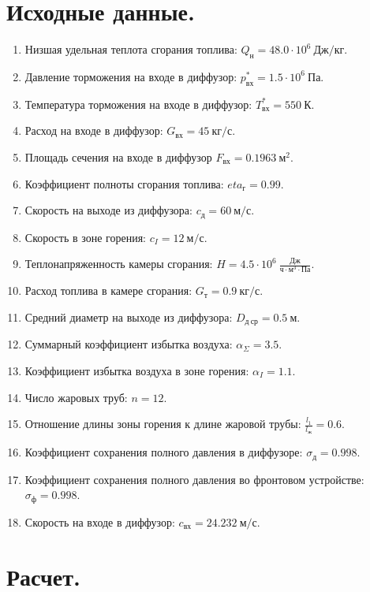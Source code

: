 \documentclass[a4paper,10pt]{article}
\begin{document}
    \section{Исходные данные.}

    

    
    \begin{enumerate}
        \item Низшая удельная теплота сгорания топлива: $ Q_н = 48.0 \cdot 10^6\ Дж/кг $.
        \item Давление торможения на входе в диффузор: $ p_{вх}^* = 1.5 \cdot 10^6\  Па$.
        \item Температура торможения на входе в диффузор: $ T_{вх}^* = 550\ К $.
        \item Расход на входе в диффузор: $G_{вх} = 45\ кг/с$.
        \item Площадь сечения на входе в диффузор $ F_{вх} = 0.1963\ м^2 $.
        \item Коэффициент полноты сгорания топлива: $eta_{г} = 0.99$.
        \item Скорость на выходе из диффузора: $c_{д} = 60\ м/с$.
        \item Скорость в зоне горения: $c_I = 12\ м/с$.
        \item Теплонапряженность камеры сгорания: $H = 4.5 \cdot10^6\ \frac{Дж}{ч \cdot м^3 \cdot Па}$.
        \item Расход топлива в камере сгорания: $G_т = 0.9\ кг/с$.
        \item Средний диаметр на выходе из диффузора: $D_{д\ ср} = 0.5\ м$.
        \item Суммарный коэффициент избытка воздуха: $\alpha_{\Sigma} = 3.5$.
        \item Коэффициент избытка воздуха в зоне горения: $\alpha_I = 1.1$.
        \item Число жаровых труб: $n = 12$.
        \item Отношение длины зоны горения к длине жаровой трубы: $\frac{l_1}{l_ж} = 0.6$.
        \item Коэффициент сохранения полного давления в диффузоре: $\sigma_д = 0.998$.
        \item Коэффициент сохранения полного давления во фронтовом устройстве: $\sigma_ф = 0.998$.
        \item Скорость на входе в диффузор: $c_{вх} = 24.232\ м/с$.
    \end{enumerate}
    

    \section{Расчет.}
\end{document}
